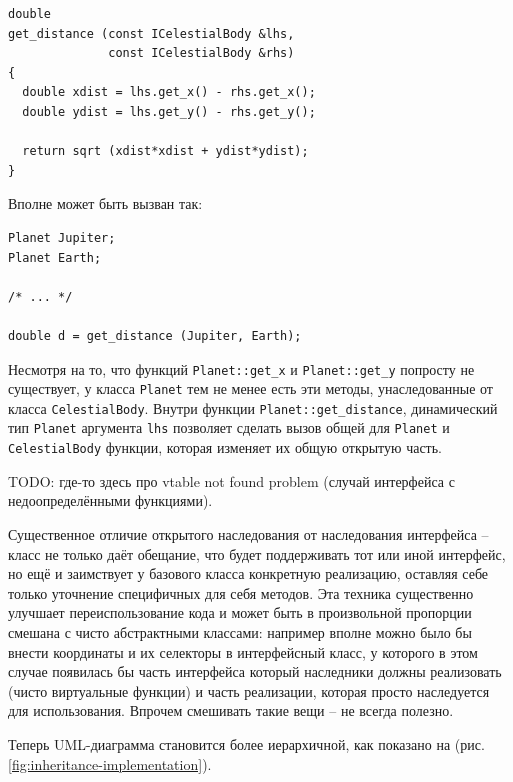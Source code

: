 \documentclass[a4paper,12pt,oneside]{article}
\begin{document}
\begin{lstlisting}
double 
get_distance (const ICelestialBody &lhs, 
              const ICelestialBody &rhs)
{
  double xdist = lhs.get_x() - rhs.get_x();
  double ydist = lhs.get_y() - rhs.get_y();

  return sqrt (xdist*xdist + ydist*ydist);
}
\end{lstlisting}

Вполне может быть вызван так:

\begin{lstlisting}
Planet Jupiter;
Planet Earth;

/* ... */

double d = get_distance (Jupiter, Earth);
\end{lstlisting}

Несмотря на то, что функций \lstinline!Planet::get_x! и \lstinline!Planet::get_y! попросту не существует, у класса \lstinline!Planet! тем не менее есть эти методы, унаследованные от класса \lstinline!CelestialBody!. Внутри функции \lstinline!Planet::get_distance!, динамический тип \lstinline!Planet! аргумента \lstinline!lhs! позволяет сделать вызов общей для \lstinline!Planet! и \lstinline!CelestialBody! функции, которая изменяет их общую открытую часть.

TODO: где-то здесь про vtable not found problem (случай интерфейса с недоопределёнными функциями).

Существенное отличие открытого наследования от наследования интерфейса -- класс не только даёт обещание, что будет поддерживать тот или иной интерфейс, но ещё и заимствует у базового класса конкретную реализацию, оставляя себе только уточнение специфичных для себя методов. Эта техника существенно улучшает переиспользование кода и может быть в произвольной пропорции смешана с чисто абстрактными классами: например вполне можно было бы внести координаты и их селекторы в интерфейсный класс, у которого в этом случае появилась бы часть интерфейса который наследники должны реализовать (чисто виртуальные функции) и часть реализации, которая просто наследуется для использования. Впрочем смешивать такие вещи -- не всегда полезно.

Теперь UML-диаграмма становится более иерархичной, как показано на (рис. \ref{fig:inheritance-implementation}).
\end{document}
